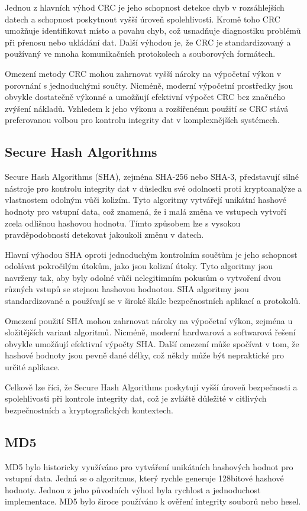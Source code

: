 \documentclass[12pt]{report}
\begin{document}
    Jednou z hlavních výhod CRC je jeho schopnost detekce chyb v rozsáhlejších datech a schopnost poskytnout vyšší úroveň spolehlivosti. Kromě toho CRC umožňuje identifikovat místo a povahu chyb, což usnadňuje diagnostiku problémů při přenosu nebo ukládání dat. Další výhodou je, že CRC je standardizovaný a používaný ve mnoha komunikačních protokolech a souborových formátech.

    Omezení metody CRC mohou zahrnovat vyšší nároky na výpočetní výkon v porovnání s jednoduchými součty. Nicméně, moderní výpočetní prostředky jsou obvykle dostatečně výkonné a umožňují efektivní výpočet CRC bez značného zvýšení nákladů. Vzhledem k jeho výkonu a rozšířenému použití se CRC stává preferovanou volbou pro kontrolu integrity dat v komplexnějších systémech.
    \cite{Cyclicre48:online}
\subsection{Secure Hash Algorithms}
Secure Hash Algorithms (SHA), zejména SHA-256 nebo SHA-3, představují silné nástroje pro kontrolu integrity dat v důsledku své odolnosti proti kryptoanalýze a vlastnostem odolným vůči kolizím. Tyto algoritmy vytvářejí unikátní hashové hodnoty pro vstupní data, což znamená, že i malá změna ve vstupech vytvoří zcela odlišnou hashovou hodnotu. Tímto způsobem lze s vysokou pravděpodobností detekovat jakoukoli změnu v datech.

    Hlavní výhodou SHA oproti jednoduchým kontrolním součtům je jeho schopnost odolávat pokročilým útokům, jako jsou kolizní útoky. Tyto algoritmy jsou navrženy tak, aby byly odolné vůči nelegitimním pokusům o vytvoření dvou různých vstupů se stejnou hashovou hodnotou. SHA algoritmy jsou standardizované a používají se v široké škále bezpečnostních aplikací a protokolů.

    Omezení použití SHA mohou zahrnovat nároky na výpočetní výkon, zejména u složitějších variant algoritmů. Nicméně, moderní hardwarová a softwarová řešení obvykle umožňují efektivní výpočty SHA. Další omezení může spočívat v tom, že hashové hodnoty jsou pevně dané délky, což někdy může být nepraktické pro určité aplikace.

    Celkově lze říci, že Secure Hash Algorithms poskytují vyšší úroveň bezpečnosti a spolehlivosti při kontrole integrity dat, což je zvláště důležité v citlivých bezpečnostních a kryptografických kontextech.
   \cite{SecureHa61:online}
\subsection{MD5}
MD5 bylo historicky využíváno pro vytváření unikátních hashových hodnot pro vstupní data. Jedná se o algoritmus, který rychle generuje 128bitové hashové hodnoty. Jednou z jeho původních výhod byla rychlost a jednoduchost implementace. MD5 bylo široce používáno k ověření integrity souborů nebo hesel.
\end{document}
